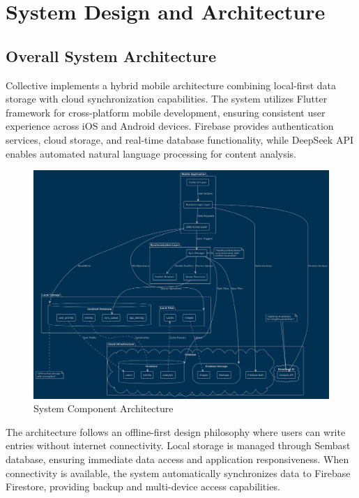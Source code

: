 \documentclass[conference]{IEEEtran}
\begin{document}
\section{System Design and Architecture}

\subsection{Overall System Architecture}

Collective implements a hybrid mobile architecture combining local-first data storage with cloud synchronization capabilities. The system utilizes Flutter framework for cross-platform mobile development, ensuring consistent user experience across iOS and Android devices. Firebase provides authentication services, cloud storage, and real-time database functionality, while DeepSeek API enables automated natural language processing for content analysis.

\begin{figure}[H]
\centering
\includegraphics[width=\columnwidth]{component_U9nrLKrF6p.png}
\caption{System Component Architecture}
\label{fig:system-architecture}
\end{figure}

The architecture follows an offline-first design philosophy where users can write entries without internet connectivity. Local storage is managed through Sembast database, ensuring immediate data access and application responsiveness. When connectivity is available, the system automatically synchronizes data to Firebase Firestore, providing backup and multi-device access capabilities.
\end{document}
